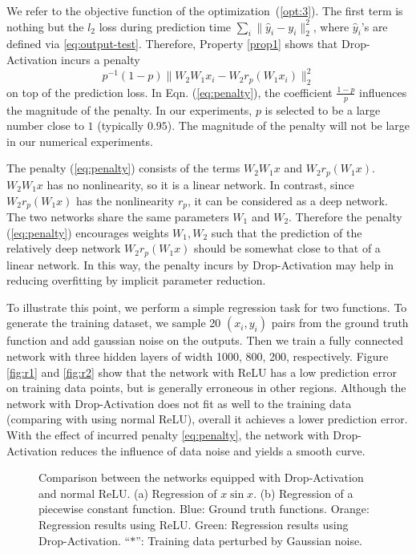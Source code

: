 \documentclass[11pt]{article}
\begin{document}
We refer to the objective function of the optimization~(\ref{opt:3}). The first term is nothing but the $l_2$ loss during prediction time $\sum_i \| \hat y_i - y_i \|_2^2$, where $\hat y_i$'s are defined via \eqref{eq:output-test}. Therefore, Property \ref{prop1} shows that Drop-Activation incurs a penalty
\begin{equation}
p^{-1}(1-p)\|W_2W_1x_i - W_2r_p(W_1x_i)\|_2^2
\label{eq:penalty}
\end{equation}
on top of the prediction loss. In Eqn. (\ref{eq:penalty}), the coefficient $\frac{1-p}{p}$ influences the magnitude of the penalty. In our experiments, $p$ is selected to be a large number close to $1$ (typically $0.95$). The magnitude of the penalty will not be large in our numerical experiments.







The penalty (\ref{eq:penalty}) consists of the terms $W_2W_1x$ and $W_2r_p(W_1x)$. $W_2W_1x$ has no nonlinearity, so it is a linear network. In contrast, since $W_2r_p(W_1x)$ has the nonlinearity $r_p$,  it can be considered as a deep network. The two networks share the same parameters $W_1$ and $W_2$. Therefore the penalty (\ref{eq:penalty}) encourages weights $W_1,W_2$ such that the prediction of the relatively deep network $W_2r_p(W_1x)$ should be somewhat close to that of a linear network. In this way, the penalty incurs by Drop-Activation may help in reducing overfitting by implicit parameter reduction. 

To illustrate this point, we perform a simple regression task for two functions. To generate the training dataset, we sample 20 $(x_i, y_i)$ pairs from the ground truth function and add gaussian noise on the outputs. Then we train a fully connected network with three hidden layers of width 1000, 800, 200, respectively. Figure \ref{fig:r1} and \ref{fig:r2} show that the network with ReLU has a low prediction error on training data points, but is generally erroneous in other regions. Although the network with Drop-Activation does not fit as well to the training data (comparing with using normal ReLU), overall it achieves a lower prediction error. With the effect of incurred penalty \eqref{eq:penalty}, the network with Drop-Activation reduces the influence of data noise and yields a smooth curve.

\begin{figure*}\centering
    \qquad
    \caption{Comparison between the networks equipped with Drop-Activation and normal ReLU. (a) Regression of $x\sin x$. (b) Regression of a piecewise constant function. Blue:  Ground truth functions. Orange: Regression results using ReLU. Green: Regression results using Drop-Activation. ``$*$'': Training data perturbed by Gaussian noise.}\label{fig:reg}\vspace{-0.5cm}
\end{figure*}
\end{document}
